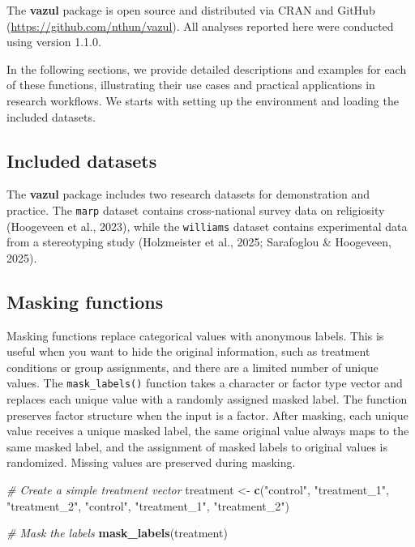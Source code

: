 \documentclass[
  english,
  man,floatsintext]{apa6}
\newenvironment{Shaded}{\begin{snugshade}}{\end{snugshade}}
\newcommand{\CommentTok}[1]{\textcolor[rgb]{0.56,0.35,0.01}{\textit{#1}}}
\newcommand{\FunctionTok}[1]{\textcolor[rgb]{0.13,0.29,0.53}{\textbf{#1}}}
\newcommand{\NormalTok}[1]{#1}
\newcommand{\OtherTok}[1]{\textcolor[rgb]{0.56,0.35,0.01}{#1}}
\newcommand{\StringTok}[1]{\textcolor[rgb]{0.31,0.60,0.02}{#1}}
\begin{document}
The \textbf{vazul} package is open source and distributed via CRAN and GitHub (\url{https://github.com/nthun/vazul}). All analyses reported here were conducted using version 1.1.0.

In the following sections, we provide detailed descriptions and examples for each of these functions, illustrating their use cases and practical applications in research workflows. We starts with setting up the environment and loading the included datasets.

\subsection{Included datasets}\label{included-datasets}

The \textbf{vazul} package includes two research datasets for demonstration and practice. The \texttt{marp} dataset contains cross-national survey data on religiosity ({Hoogeveen et al.}, 2023), while the \texttt{williams} dataset contains experimental data from a stereotyping study (Holzmeister et al., 2025; Sarafoglou \& Hoogeveen, 2025).

\subsection{Masking functions}\label{masking-functions}

Masking functions replace categorical values with anonymous labels. This is useful when you want to hide the original information, such as treatment conditions or group assignments, and there are a limited number of unique values. The \texttt{mask\_labels()} function takes a character or factor type vector and replaces each unique value with a randomly assigned masked label. The function preserves factor structure when the input is a factor. After masking, each unique value receives a unique masked label, the same original value always maps to the same masked label, and the assignment of masked labels to original values is randomized. Missing values are preserved during masking.

\begin{Shaded}
\begin{Highlighting}[]
\CommentTok{\# Create a simple treatment vector}
\NormalTok{treatment }\OtherTok{\textless{}{-}} \FunctionTok{c}\NormalTok{(}\StringTok{"control"}\NormalTok{, }\StringTok{"treatment\_1"}\NormalTok{, }\StringTok{"treatment\_2"}\NormalTok{, }\StringTok{"control"}\NormalTok{, }\StringTok{"treatment\_1"}\NormalTok{, }\StringTok{"treatment\_2"}\NormalTok{)}

\CommentTok{\# Mask the labels}
\FunctionTok{mask\_labels}\NormalTok{(treatment)}
\end{Highlighting}
\end{Shaded}
\end{document}
